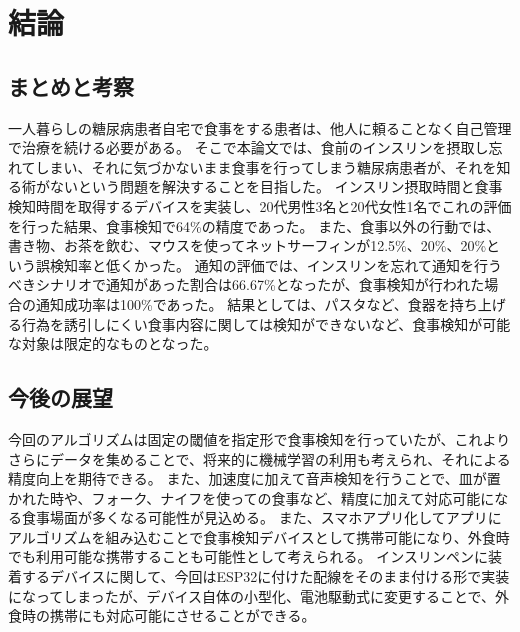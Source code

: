 \chapter{結論}
\label{chap:conclusion}

\section{まとめと考察}
\label{section:conclusion_sum}

一人暮らしの糖尿病患者自宅で食事をする患者は、他人に頼ることなく自己管理で治療を続ける必要がある。
そこで本論文では、食前のインスリンを摂取し忘れてしまい、それに気づかないまま食事を行ってしまう糖尿病患者が、それを知る術がないという問題を解決することを目指した。
インスリン摂取時間と食事検知時間を取得するデバイスを実装し、20代男性3名と20代女性1名でこれの評価を行った結果、食事検知で64\%の精度であった。
また、食事以外の行動では、書き物、お茶を飲む、マウスを使ってネットサーフィンが12.5\%、20\%、20\%という誤検知率と低くかった。
通知の評価では、インスリンを忘れて通知を行うべきシナリオで通知があった割合は66.67\%となったが、食事検知が行われた場合の通知成功率は100\%であった。
結果としては、パスタなど、食器を持ち上げる行為を誘引しにくい食事内容に関しては検知ができないなど、食事検知が可能な対象は限定的なものとなった。

\section{今後の展望}

今回のアルゴリズムは固定の閾値を指定形で食事検知を行っていたが、これよりさらにデータを集めることで、将来的に機械学習の利用も考えられ、それによる精度向上を期待できる。
また、加速度に加えて音声検知を行うことで、皿が置かれた時や、フォーク、ナイフを使っての食事など、精度に加えて対応可能になる食事場面が多くなる可能性が見込める。
また、スマホアプリ化してアプリにアルゴリズムを組み込むことで食事検知デバイスとして携帯可能になり、外食時でも利用可能な携帯することも可能性として考えられる。
インスリンペンに装着するデバイスに関して、今回はESP32に付けた配線をそのまま付ける形で実装になってしまったが、デバイス自体の小型化、電池駆動式に変更することで、外食時の携帯にも対応可能にさせることができる。
